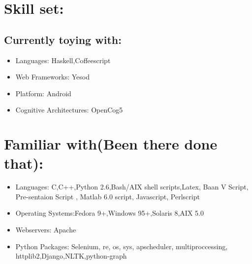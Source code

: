 \section {Skill set:}
	\subsection {Currently toying with:}
		\begin{itemize}
			\item Languages: Haskell,Coffeescript

	 		\item Web Frameworks: Yesod

			\item Platform: Android

	 		\item Cognitive Architectures: OpenCog5
		\end{itemize}

\section {Familiar with(Been there done that):}
	\begin{itemize}

		\item Languages: C,C++,Python 2.6,Bash/AIX shell scripts,Latex, Baan V Script, Pre-sentaion Script , Matlab 6.0 script, Javascript, Perlscript

		\item Operating Systems:Fedora 9+,Windows 95+,Solaris 8,AIX 5.0

		\item Webservers: Apache

		\item Python Packages: Selenium, re, os, sys, apscheduler, multiproccessing, httplib2,Django,NLTK,python-graph
	\end{itemize}
